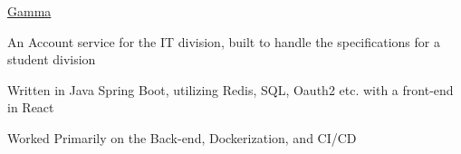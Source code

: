 
\begin{cventries}
  \cventry
    {} %
    {\href{https://github.com/cthit/gamma}{Gamma}} %
    {} %
    {} %
    {
      \begin{cvitems} %
        \item {An Account service for the IT division, built to handle the specifications for a student division}
        \item {Written in Java Spring Boot, utilizing Redis, SQL, Oauth2 etc. with a front-end in React}
		\item {Worked Primarily on the Back-end, Dockerization, and CI/CD}
      \end{cvitems}
    }

\end{cventries}